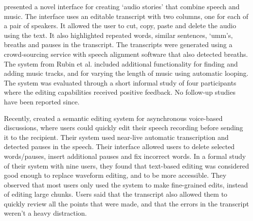 \citet{Rubin2013} presented a novel interface for creating `audio
stories' that combine speech and music. The interface uses an editable
transcript with two columns, one for each of a pair of speakers.  It allowed
the user to cut, copy, paste and delete the audio using the text. It also
highlighted repeated words, similar sentences, `umm's, breaths and pauses in
the transcript. The transcripts were generated using a crowd-sourcing service
with speech alignment software that also detected breaths.  The system from
Rubin et al. included additional functionality for finding and adding music
tracks, and for varying the length of music using automatic looping. The system
was evaluated through a short informal study of four participants where the
editing capabilities received positive feedback. No follow-up studies have been
reported since.

Recently, \citet{Sivaraman2016} created a semantic editing system for
asynchronous voice-based discussions, where users could quickly edit their
speech recording before sending it to the recipient.  Their system used
near-live automatic transcription and detected pauses in the speech. Their
interface allowed users to delete selected words/pauses, insert
additional pauses and fix incorrect words.  In a formal study of their system
with nine users, they found that text-based editing was considered good enough
to replace waveform editing, and to be more accessible. They observed that most
users only used the system to make fine-grained edits, instead of editing large
chunks.  Users said that the transcript also allowed them to quickly
review all the points that were made, and that the errors in the transcript
weren't a heavy distraction.




